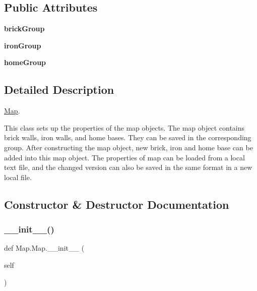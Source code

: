 \subsection*{Public Attributes}
\begin{DoxyCompactItemize}
\item 
\mbox{\label{class_map_1_1_map_aa1dd987b5f5a71f3363bf6eca47ebe57}} 
{\bfseries brick\+Group}
\item 
\mbox{\label{class_map_1_1_map_ab7e7a0c32c3f0850e443a46594fdb318}} 
{\bfseries iron\+Group}
\item 
\mbox{\label{class_map_1_1_map_a7a3537f399cd0cd1c934fd93af83b32a}} 
{\bfseries home\+Group}
\end{DoxyCompactItemize}


\subsection{Detailed Description}
\mbox{\hyperlink{class_map_1_1_map}{Map}}. 

This class sets up the properties of the map objects. The map object contains brick walls, iron walls, and home bases. They can be saved in the corresponding group. After constructing the map object, new brick, iron and home base can be added into this map object. The properties of map can be loaded from a local text file, and the changed version can also be saved in the same format in a new local file. 

\subsection{Constructor \& Destructor Documentation}
\mbox{\label{class_map_1_1_map_a16b297030b6f61b2601cd40d2e5b5e0d}} 
\subsubsection{\texorpdfstring{\_\_init\_\_()}{\_\_init\_\_()}}
{\footnotesize\ttfamily def Map.\+Map.\+\_\+\+\_\+init\+\_\+\+\_\+ (\begin{DoxyParamCaption}\item[{}]{self }\end{DoxyParamCaption})}



